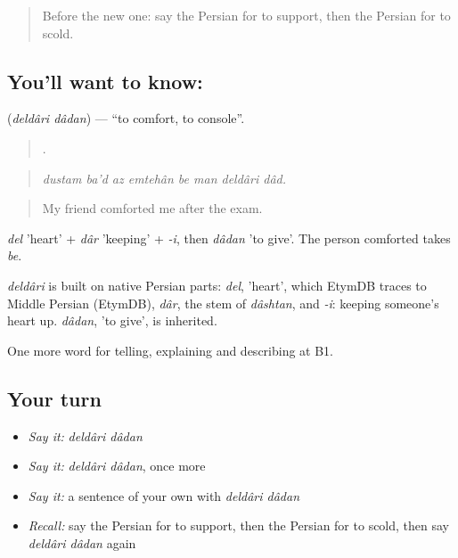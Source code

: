 \label{lesson:FA-C505-deldari-dadan}



\begin{quote}
Before the new one: say the Persian for to support, then the Persian for to scold.
\end{quote}

\subsection*{You'll want to know:  }
\textbf{ } (\emph{deldâri dâdan}) — \textquotedblleft{}to comfort, to console\textquotedblright{}.

\begin{quote}
       .
\end{quote}

\begin{quote}
\emph{dustam ba'd az emtehân be man deldâri dâd.}
\end{quote}

\begin{quote}
My friend comforted me after the exam.
\end{quote}

\emph{del} 'heart' + \emph{dâr} 'keeping' + \emph{-i}, then \emph{dâdan} 'to give'. The person comforted takes \emph{be}.

\begin{cousinweb}
\emph{deldâri} is built on native Persian parts: \emph{del}, 'heart', which EtymDB traces to Middle Persian (EtymDB), \emph{dâr}, the stem of \emph{dâshtan}, and \emph{-i}: keeping someone's heart up. \emph{dâdan}, 'to give', is inherited.
\end{cousinweb}

\begin{grammarlens}[title={What you've built}]
One more word for telling, explaining and describing at B1.
\end{grammarlens}

\subsection*{Your turn}
\begin{itemize}
\raggedright
  \item \emph{Say it:} \emph{deldâri dâdan}
  \item \emph{Say it:} \emph{deldâri dâdan}, once more
  \item \emph{Say it:} a sentence of your own with \emph{deldâri dâdan}
  \item \emph{Recall:} say the Persian for to support, then the Persian for to scold, then say \emph{deldâri dâdan} again
\end{itemize}

